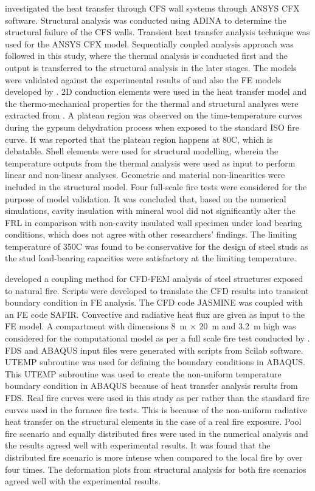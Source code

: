 \citet{Thanasoulas2016} investigated the heat transfer through CFS wall systems through ANSYS CFX software. Structural analysis was conducted using ADINA to determine the structural failure of the CFS walls. Transient heat transfer analysis technique was used for the ANSYS CFX model. Sequentially coupled analysis approach was followed in this study, where the thermal analysis is conducted first and the output is transferred to the structural analysis in the later stages. The models were validated against the experimental results of \citet{Gunalan2013e} and also the FE models developed by \citet{Gunalan2013f}. 2D conduction elements were used in the heat transfer model and the thermo-mechanical properties for the thermal and structural analyses were extracted from \citet{GhaziWakili2007,Kolaitis2013}. A plateau region was observed on the time-temperature curves during the gypsum dehydration process when exposed to the standard ISO fire curve. It was reported that the plateau region happens at 80\degree C, which is debatable. Shell elements were used for structural modelling, wherein the temperature outputs from the thermal analysis were used as input to perform linear and non-linear analyses. Geometric and material non-linearities were included in the structural model. Four full-scale fire tests were considered for the purpose of model validation. It was concluded that, based on the numerical simulations, cavity insulation with mineral wool did not significantly alter the FRL in comparison with non-cavity insulated wall specimen under load bearing conditions, which does not agree with other researchers' findings. The limiting temperature of 350\degree C was found to be conservative for the design of steel studs as the stud load-bearing capacities were satisfactory at the limiting temperature.      

\citet{Malendowski2017} developed a coupling method for CFD-FEM analysis of steel structures exposed to natural fire. Scripts were developed to translate the CFD results into transient boundary condition in FE analysis. The CFD code JASMINE was coupled with an FE code SAFIR. Convective and radiative heat flux are given as input to the FE model. A compartment with dimensions 8~m $\times$ 20~m and 3.2~m high was considered for the computational model as per a full scale fire test conducted by \citet{Pyl2012}. FDS and ABAQUS input files were generated with scripts from Scilab software. UTEMP subroutine was used for defining the boundary conditions in ABAQUS. This UTEMP subroutine was used to create the non-uniform temperature boundary condition in ABAQUS because of heat transfer analysis results from FDS. Real fire curves were used in this study as per \citet{Pyl2012} rather than the standard fire curves used in the furnace fire tests. This is because of the non-uniform radiative heat transfer on the structural elements in the case of a real fire exposure. Pool fire scenario and equally distributed fires were used in the numerical analysis and the results agreed well with experimental results. It was found that the distributed fire scenario is more intense when compared to the local fire by over four times. The deformation plots from structural analysis for both fire scenarios agreed well with the experimental results. 

